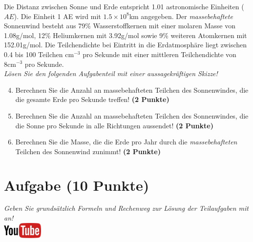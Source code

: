 \documentclass[a4paper, 9pt]{scrartcl}\usepackage[]{graphicx}\usepackage[]{xcolor}
\begin{document}
Die Distanz zwischen Sonne und Erde entspricht 1.01 astronomische Einheiten ($AE$). Die Einheit 1 AE wird mit \ensuremath{1.5\times 10^{8}}km angegeben. Der \textit{massebehaftete} Sonnenwind besteht aus 79\% Wasserstoffkernen mit einer molaren Masse von 1.08g/mol, 12\% Heliumkernen mit 3.92g/mol sowie 9\% weiteren Atomkernen mit  152.01g/mol. Die Teilchendichte bei Eintritt in die Erdatmosphäre liegt zwischen 0.4 bis 100 Teilchen cm$^{-3}$ pro Sekunde mit einer mittleren Teilchendichte von 8cm$^{-3}$ pro Sekunde. \\

\textit{Lösen Sie den folgenden Aufgabenteil mit einer aussagekräftigen Skizze!}

\begin{enumerate}
  \setcounter{enumi}{3}
\item Berechnen Sie die Anzahl an massebehafteten Teilchen des Sonnenwindes, die die gesamte Erde pro Sekunde treffen! \textbf{(2 Punkte)}
\item Berechnen Sie die Anzahl an massebehafteten Teilchen des Sonnenwindes, die die Sonne pro Sekunde in alle Richtungen aussendet! \textbf{(2 Punkte)}
\item Berechnen Sie die Masse, die die Erde pro Jahr durch die \textit{massebehafteten} Teilchen des Sonnenwind zunimmt! \textbf{(2 Punkte)}
\end{enumerate}


\clearpage

\section{Aufgabe \hfill (10 Punkte)}

\textit{Geben Sie grunds{\"a}tzlich Formeln und Rechenweg zur L{\"o}sung der
  Teilaufgaben mit an!} \\[1Ex]

\hfill\href{https://youtu.be/n451XnhtSh4}{\includegraphics[width = 2cm]{img/youtube}} %
\hspace{2Ex}
\end{document}
